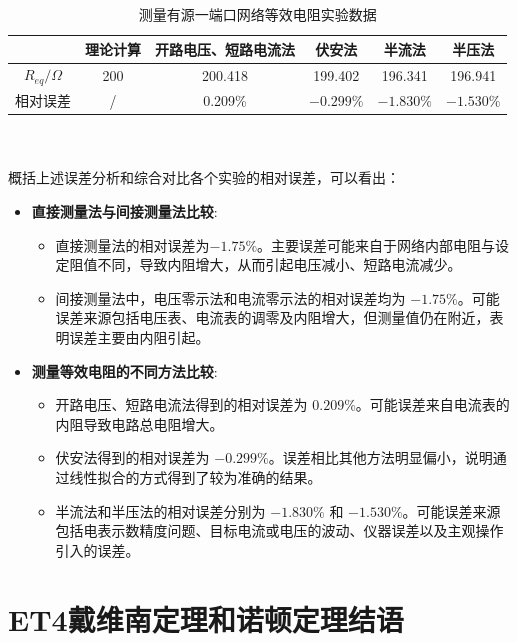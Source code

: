 \documentclass[dvipsnames, svgnames,a4paper,11pt]{article}
\begin{document}
\begin{table}[H]
	\centering
	\begin{tabular}{|c|c|c|c|c|c|}
		\hline
		 & 理论计算 & 开路电压、短路电流法 & 伏安法 & 半流法 & 半压法 \\
		\hline
		 $R_{eq}/\Omega$  & 200  & 200.418     & 199.402& 196.341   & 196.941    \\
		 \hline
		相对误差 & / & 0.209\% & $-0.299\%$  & $-1.830\%$ & $-1.530\%$  \\
		\hline
	\end{tabular}
	\caption{测量有源一端口网络等效电阻实验数据}
\end{table}
\quad \\
\quad \\
概括上述误差分析和综合对比各个实验的相对误差，可以看出：
\begin{itemize}
    \item \textbf{直接测量法与间接测量法比较}:
    \begin{itemize}
        \item 直接测量法的相对误差为$-1.75\%$。主要误差可能来自于网络内部电阻与设定阻值不同，导致内阻增大，从而引起电压减小、短路电流减少。
        \item 间接测量法中，电压零示法和电流零示法的相对误差均为 $-1.75\%$。可能误差来源包括电压表、电流表的调零及内阻增大，但测量值仍在附近，表明误差主要由内阻引起。
    \end{itemize}
    \item \textbf{测量等效电阻的不同方法比较}:
    \begin{itemize}
        \item 开路电压、短路电流法得到的相对误差为 $0.209\%$。可能误差来自电流表的内阻导致电路总电阻增大。
        \item 伏安法得到的相对误差为 $-0.299\%$。误差相比其他方法明显偏小，说明通过线性拟合的方式得到了较为准确的结果。
        \item 半流法和半压法的相对误差分别为 $-1.830\%$ 和 $-1.530\%$。可能误差来源包括电表示数精度问题、目标电流或电压的波动、仪器误差以及主观操作引入的误差。
    \end{itemize}
    
\end{itemize}


	\clearpage

	\section{ET4戴维南定理和诺顿定理\quad\heiti 结语}
	
\end{document}
